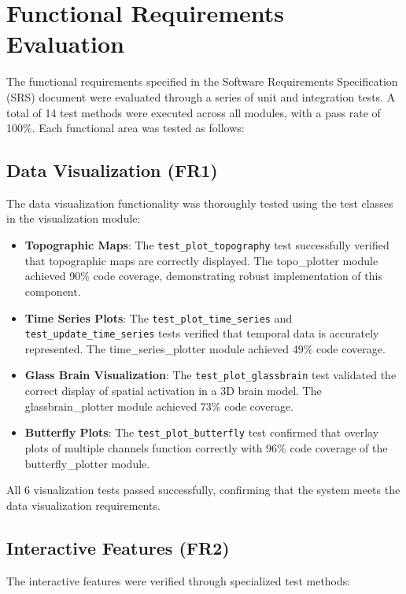 \documentclass[12pt, titlepage]{article}
\begin{document}
\section{Functional Requirements Evaluation}

The functional requirements specified in the Software Requirements Specification (SRS) document were evaluated through a series of unit and integration tests. A total of 14 test methods were executed across all modules, with a pass rate of 100\%. Each functional area was tested as follows:

\subsection{Data Visualization (FR1)}
The data visualization functionality was thoroughly tested using the test classes in the visualization module:

\begin{itemize}
    \item \textbf{Topographic Maps}: The \texttt{test\_plot\_topography} test successfully verified that topographic maps are correctly displayed. The topo\_plotter module achieved 90\% code coverage, demonstrating robust implementation of this component.
    
    \item \textbf{Time Series Plots}: The \texttt{test\_plot\_time\_series} and \texttt{test\_update\_time\_series} tests verified that temporal data is accurately represented. The time\_series\_plotter module achieved 49\% code coverage.
    
    \item \textbf{Glass Brain Visualization}: The \texttt{test\_plot\_glassbrain} test validated the correct display of spatial activation in a 3D brain model. The glassbrain\_plotter module achieved 73\% code coverage.
    
    \item \textbf{Butterfly Plots}: The \texttt{test\_plot\_butterfly} test confirmed that overlay plots of multiple channels function correctly with 96\% code coverage of the butterfly\_plotter module.
\end{itemize}

All 6 visualization tests passed successfully, confirming that the system meets the data visualization requirements.

\subsection{Interactive Features (FR2)}
The interactive features were verified through specialized test methods:
\end{document}
